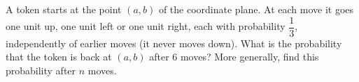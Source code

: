 A token starts at the point $(a,b)$ of the coordinate plane. At each move it goes one unit up, one unit left or one unit right, each with probability $\dfrac{1}{3}$, independently of earlier moves (it never moves down). What is the probability that the token is back at $(a,b)$ after $6$ moves? More generally, find this probability after $n$ moves.
